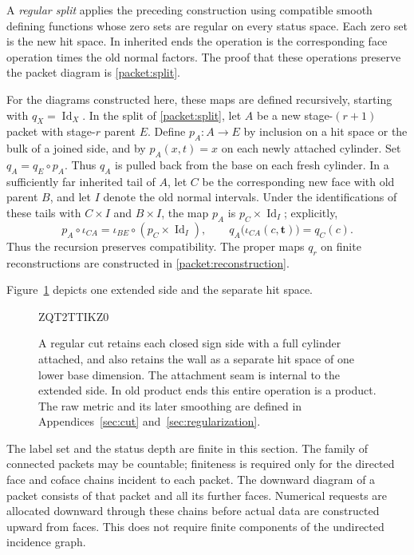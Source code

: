 \documentclass[11pt]{article}
\numberwithin{equation}{section}
\theoremstyle{definition}
\theoremstyle{remark}
\begin{document}
A \emph{regular split} applies the preceding construction using
compatible smooth defining functions whose zero sets are regular on
every status space. Each zero set is the new hit space.
In inherited ends the operation is the corresponding face operation
times the old normal factors. The proof that these operations preserve
the packet diagram is \cref{packet:split}.

For the diagrams constructed here, these maps are defined recursively,
starting with $q_X=\operatorname{Id}_X$.  In the split of \cref{packet:split}, let
$A$ be a new stage-$(r+1)$ packet with stage-$r$ parent $E$.
Define $p_A:A\to E$ by inclusion on a hit space or the bulk of a joined
side, and by $p_A(x,t)=x$ on each newly attached cylinder.
Set $q_A=q_E\circ p_A$.  Thus $q_A$ is pulled back from the base on
each fresh cylinder.  In a sufficiently far inherited tail of $A$,
let $C$ be the corresponding new face with old parent $B$, and let
$I$ denote the old normal intervals.  Under the identifications of
these tails with $C\times I$ and $B\times I$, the map $p_A$ is
$p_C\times\operatorname{Id}_I$; explicitly,
\[
 p_A\circ\iota_{CA}=\iota_{BE}\circ(p_C\times\operatorname{Id}_I),\qquad
 q_A\bigl(\iota_{CA}(c,\mathbf t)\bigr)=q_C(c).
\]
Thus the recursion preserves compatibility.  The proper maps $q_r$
on finite reconstructions are constructed in
\cref{packet:reconstruction}.

Figure~\ref{fig:regular-packet-split} depicts one extended side and the
separate hit space.
\begin{figure}[!b]

ZQT2TTIKZ0
\caption{A regular cut retains each closed sign side with a full cylinder
attached, and also retains the wall as a separate hit space of one lower base
dimension. The attachment seam is internal to the extended side. In old
product ends this entire operation is a product. The raw metric and its
later smoothing are defined in Appendices~\ref{sec:cut} and~\ref{sec:regularization}.}
\label{fig:regular-packet-split}
\end{figure}


The label set and the status depth are finite in this section. The family
of connected packets may be countable; finiteness is required only for
the directed face and coface chains incident to each packet. The
downward diagram of a packet consists of that packet and all its further
faces. Numerical
requests are allocated downward through these chains before actual data
are constructed upward from faces. This does not require finite
components of the undirected incidence graph.
\end{document}

